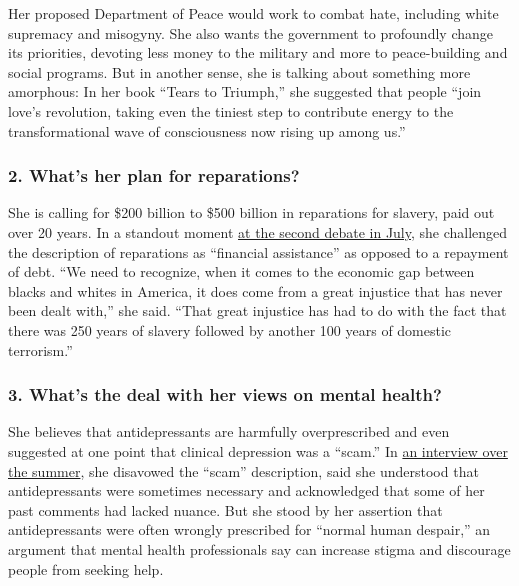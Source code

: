 Her proposed Department of Peace would work to combat hate, including
white supremacy and misogyny. She also wants the government to
profoundly change its priorities, devoting less money to the military
and more to peace-building and social programs. But in another sense,
she is talking about something more amorphous: In her book ``Tears to
Triumph,'' she suggested that people ``join love's revolution, taking
even the tiniest step to contribute energy to the transformational wave
of consciousness now rising up among us.''

\hypertarget{2-whats-her-plan-for-reparations}{%
\subsubsection{\texorpdfstring{\textbf{2. What's her plan for
reparations?}}{2. What's her plan for reparations?}}\label{2-whats-her-plan-for-reparations}}

She is calling for \$200 billion to \$500 billion in reparations for
slavery, paid out over 20 years. In a standout moment
\href{https://www.nytimes3xbfgragh.onion/2019/07/30/us/politics/marianne-williamson-debate-quotes.html}{at
the second debate in July}, she challenged the description of
reparations as ``financial assistance'' as opposed to a repayment of
debt. ``We need to recognize, when it comes to the economic gap between
blacks and whites in America, it does come from a great injustice that
has never been dealt with,'' she said. ``That great injustice has had to
do with the fact that there was 250 years of slavery followed by another
100 years of domestic terrorism.''

\hypertarget{3-whats-the-deal-with-her-views-on-mental-health}{%
\subsubsection{\texorpdfstring{\textbf{3. What's the deal with her views
on mental
health?}}{3. What's the deal with her views on mental health?}}\label{3-whats-the-deal-with-her-views-on-mental-health}}

She believes that antidepressants are harmfully overprescribed and even
suggested at one point that clinical depression was a ``scam.'' In
\href{https://www.nytimes3xbfgragh.onion/2019/07/27/us/politics/marianne-williamson-mental-health.html}{an
interview over the summer}, she disavowed the ``scam'' description, said
she understood that antidepressants were sometimes necessary and
acknowledged that some of her past comments had lacked nuance. But she
stood by her assertion that antidepressants were often wrongly
prescribed for ``normal human despair,'' an argument that mental health
professionals say can increase stigma and discourage people from seeking
help.

